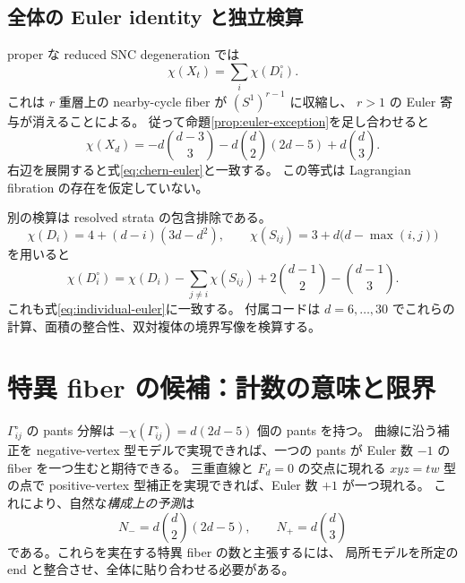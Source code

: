 \documentclass[11pt,a4paper]{article}
\theoremstyle{definition}
\begin{document}
\subsection{全体の Euler identity と独立検算}

proper な reduced SNC degeneration では
\[
\chi(X_t)=\sum_i\chi(D_i^\circ).
\]
これは $r$ 重層上の nearby-cycle fiber が $(S^1)^{r-1}$ に収縮し、
$r>1$ の Euler 寄与が消えることによる。
従って命題\ref{prop:euler-exception}を足し合わせると
\begin{equation}\label{eq:main-euler}
\boxed{\quad
\chi(X_d)=-d\binom{d-3}{3}-d\binom d2(2d-5)+d\binom d3.
\quad}
\end{equation}
右辺を展開すると式\eqref{eq:chern-euler}と一致する。
この等式は Lagrangian fibration の存在を仮定していない。

別の検算は resolved strata の包含排除である。
\[
\chi(D_i)=4+(d-i)(3d-d^2),\qquad
\chi(S_{ij})=3+d\bigl(d-\max(i,j)\bigr)
\]
を用いると
\[
\chi(D_i^\circ)=\chi(D_i)-\sum_{j\ne i}\chi(S_{ij})
+2\binom{d-1}{2}-\binom{d-1}{3}.
\]
これも式\eqref{eq:individual-euler}に一致する。
付属コードは $d=6,\ldots,30$ でこれらの計算、面積の整合性、双対複体の境界写像を検算する。

\section{特異 fiber の候補：計数の意味と限界}\label{sec:fibers}

$\Gamma_{ij}^{\circ}$ の pants 分解は
$-\chi(\Gamma_{ij}^{\circ})=d(2d-5)$ 個の pants を持つ。
曲線に沿う補正を negative-vertex 型モデルで実現できれば、一つの pants が
Euler 数 $-1$ の fiber を一つ生むと期待できる。
三重直線と $F_d=0$ の交点に現れる $xyz=tw$ 型の点で
positive-vertex 型補正を実現できれば、Euler 数 $+1$ が一つ現れる。
これにより、自然な\emph{構成上の予測}は
\begin{equation}\label{eq:predicted}
N_-=d\binom d2(2d-5),\qquad N_+=d\binom d3
\end{equation}
である。これらを実在する特異 fiber の数と主張するには、
局所モデルを所定の end と整合させ、全体に貼り合わせる必要がある。
\end{document}
